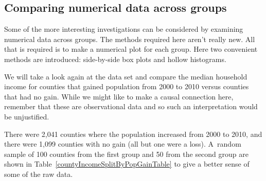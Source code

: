 
\subsection{Comparing numerical data across groups}
\label{comparingAcrossGroups}


Some of the more interesting investigations can be considered by examining numerical data across groups. The methods required here aren't really new. All that is required is to make a numerical plot for each group. Here two convenient methods are introduced: side-by-side box plots and hollow histograms.

We will take a look again at the  data set and compare the median household income for counties that gained population from 2000 to 2010 versus counties that had no gain. While we might like to make a causal connection here, remember that these are observational data and so such an interpretation would be unjustified.

There were 2,041 counties where the population increased from 2000 to 2010, and there were 1,099 counties with no gain (all but one were a loss). A~random sample of 100 counties from the first group and 50 from the second group are shown in Table~\ref{countyIncomeSplitByPopGainTable} to give a better sense of some of the raw data.

